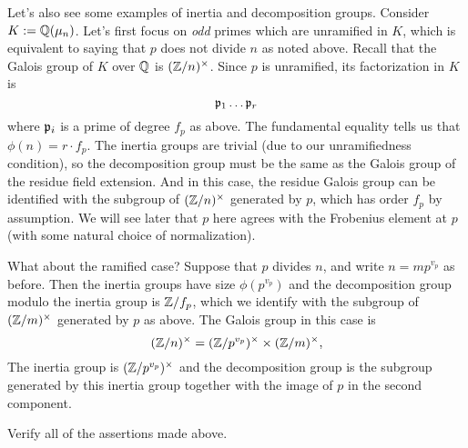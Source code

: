Let's also see some examples of inertia and decomposition groups.
Consider $K := \mathbb{Q}(\mu_{n})$.
Let's first focus on \emph{odd} primes which are unramified in $K$, which is equivalent to saying that $p$ does not divide $n$ as noted above.
Recall that the Galois group of $K$ over $\mathbb{Q}$ is $(\mathbb{Z}/n)^{\times}$.
Since $p$ is unramified, its factorization in $K$ is
\[ \mathfrak{p}_{1} \dots \mathfrak{p}_{r} \]
where $\mathfrak{p}_{i}$ is a prime of degree $f_{p}$ as above.
The fundamental equality tells us that $\phi(n) = r \cdot f_{p}$.
The inertia groups are trivial (due to our unramifiedness condition), so the decomposition group must be the same as the Galois group of the residue field extension.
And in this case, the residue Galois group can be identified with the subgroup of $(\mathbb{Z}/n)^{\times}$ generated by $p$, which has order $f_{p}$ by assumption.
We will see later that $p$ here agrees with the Frobenius element at $p$ (with some natural choice of normalization).

What about the ramified case?
Suppose that $p$ divides $n$, and write $n = m p^{v_{p}}$ as before.
Then the inertia groups have size $\phi(p^{v_{p}})$ and the decomposition group modulo the inertia group is $\mathbb{Z}/f_{p}$, which we identify with the subgroup of $(\mathbb{Z}/m)^{\times}$ generated by $p$ as above.
The Galois group in this case is
\[ (\mathbb{Z}/n)^{\times} = (\mathbb{Z}/p^{v_{p}})^{\times} \times (\mathbb{Z}/m)^{\times},\]
The inertia group is $(\mathbb{Z}/p^{v_{p}})^{\times}$ and the decomposition group is the subgroup generated by this inertia group together with the image of $p$ in the second component.

\begin{exercise}
  Verify all of the assertions made above.
\end{exercise}

